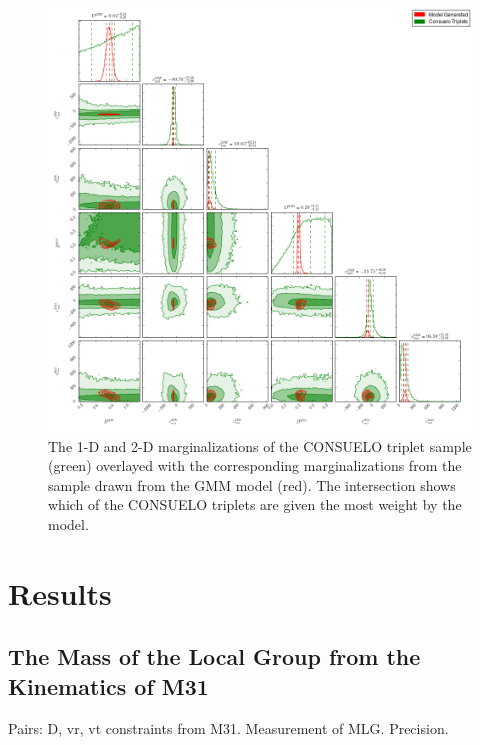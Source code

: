 \documentclass[iop,apj]{emulateapj}
\begin{document}
\begin{figure}
  \centering \includegraphics[width=\textwidth]{plots/sim_plot.png}
  \caption{The 1-D and 2-D marginalizations of the CONSUELO triplet sample (green) overlayed with the corresponding marginalizations from the sample drawn from the GMM model (red). The intersection shows which of the CONSUELO triplets are given the most weight by the model.}
  \label{fig:sim_plot}
\end{figure}


\section{Results}
\label{sec:results}


\subsection{The Mass of the Local Group from the Kinematics of M31}
\label{sec:results:LGmass}

Pairs: D, vr, vt constraints from M31. 
Measurement of  MLG. Precision. 
\end{document}
